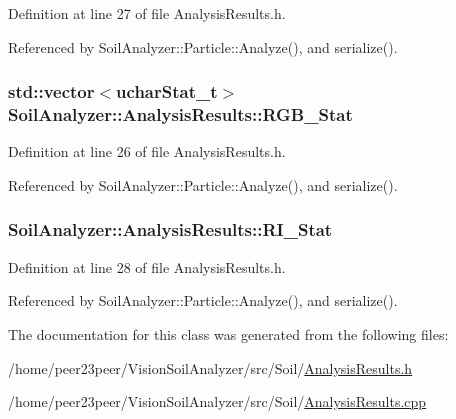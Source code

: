 Definition at line 27 of file Analysis\+Results.\+h.



Referenced by Soil\+Analyzer\+::\+Particle\+::\+Analyze(), and serialize().

\hypertarget{class_soil_analyzer_1_1_analysis_results_ab35eca5f2cfca4b80797cfc314d5cdf5}{}
\subsubsection[{R\+G\+B\+\_\+\+Stat}]{\setlength{\rightskip}{0pt plus 5cm}std\+::vector$<${\bf uchar\+Stat\+\_\+t}$>$ Soil\+Analyzer\+::\+Analysis\+Results\+::\+R\+G\+B\+\_\+\+Stat}\label{class_soil_analyzer_1_1_analysis_results_ab35eca5f2cfca4b80797cfc314d5cdf5}


Definition at line 26 of file Analysis\+Results.\+h.



Referenced by Soil\+Analyzer\+::\+Particle\+::\+Analyze(), and serialize().

\hypertarget{class_soil_analyzer_1_1_analysis_results_a3bbccb36afd62b9a35b7afa578c4919d}{}
\subsubsection[{R\+I\+\_\+\+Stat}]{ Soil\+Analyzer\+::\+Analysis\+Results\+::\+R\+I\+\_\+\+Stat}\label{class_soil_analyzer_1_1_analysis_results_a3bbccb36afd62b9a35b7afa578c4919d}


Definition at line 28 of file Analysis\+Results.\+h.



Referenced by Soil\+Analyzer\+::\+Particle\+::\+Analyze(), and serialize().



The documentation for this class was generated from the following files\+:\begin{DoxyCompactItemize}
\item 
/home/peer23peer/\+Vision\+Soil\+Analyzer/src/\+Soil/\hyperlink{_analysis_results_8h}{Analysis\+Results.\+h}\item 
/home/peer23peer/\+Vision\+Soil\+Analyzer/src/\+Soil/\hyperlink{_analysis_results_8cpp}{Analysis\+Results.\+cpp}\end{DoxyCompactItemize}
